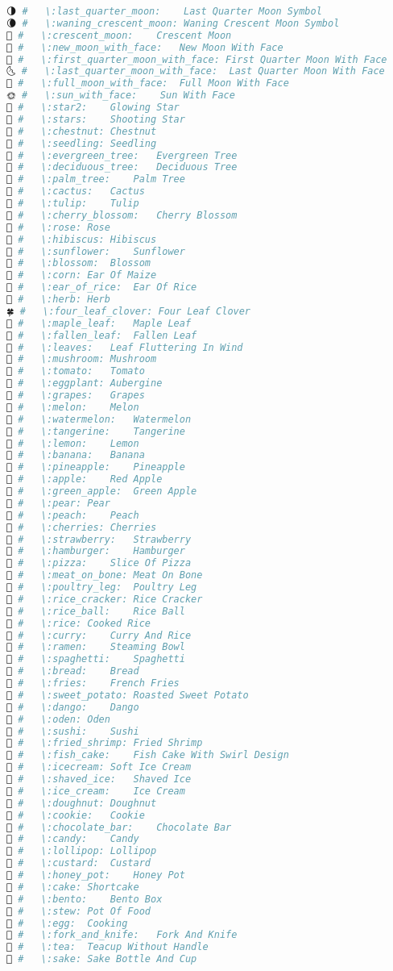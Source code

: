 \begin{lstlisting}[language=Julia, style=julia]
🌗 #   \:last_quarter_moon:    Last Quarter Moon Symbol
🌘 #   \:waning_crescent_moon: Waning Crescent Moon Symbol
🌙 #   \:crescent_moon:    Crescent Moon
🌚 #   \:new_moon_with_face:   New Moon With Face
🌛 #   \:first_quarter_moon_with_face: First Quarter Moon With Face
🌜 #   \:last_quarter_moon_with_face:  Last Quarter Moon With Face
🌝 #   \:full_moon_with_face:  Full Moon With Face
🌞 #   \:sun_with_face:    Sun With Face
🌟 #   \:star2:    Glowing Star
🌠 #   \:stars:    Shooting Star
🌰 #   \:chestnut: Chestnut
🌱 #   \:seedling: Seedling
🌲 #   \:evergreen_tree:   Evergreen Tree
🌳 #   \:deciduous_tree:   Deciduous Tree
🌴 #   \:palm_tree:    Palm Tree
🌵 #   \:cactus:   Cactus
🌷 #   \:tulip:    Tulip
🌸 #   \:cherry_blossom:   Cherry Blossom
🌹 #   \:rose: Rose
🌺 #   \:hibiscus: Hibiscus
🌻 #   \:sunflower:    Sunflower
🌼 #   \:blossom:  Blossom
🌽 #   \:corn: Ear Of Maize
🌾 #   \:ear_of_rice:  Ear Of Rice
🌿 #   \:herb: Herb
🍀 #   \:four_leaf_clover: Four Leaf Clover
🍁 #   \:maple_leaf:   Maple Leaf
🍂 #   \:fallen_leaf:  Fallen Leaf
🍃 #   \:leaves:   Leaf Fluttering In Wind
🍄 #   \:mushroom: Mushroom
🍅 #   \:tomato:   Tomato
🍆 #   \:eggplant: Aubergine
🍇 #   \:grapes:   Grapes
🍈 #   \:melon:    Melon
🍉 #   \:watermelon:   Watermelon
🍊 #   \:tangerine:    Tangerine
🍋 #   \:lemon:    Lemon
🍌 #   \:banana:   Banana
🍍 #   \:pineapple:    Pineapple
🍎 #   \:apple:    Red Apple
🍏 #   \:green_apple:  Green Apple
🍐 #   \:pear: Pear
🍑 #   \:peach:    Peach
🍒 #   \:cherries: Cherries
🍓 #   \:strawberry:   Strawberry
🍔 #   \:hamburger:    Hamburger
🍕 #   \:pizza:    Slice Of Pizza
🍖 #   \:meat_on_bone: Meat On Bone
🍗 #   \:poultry_leg:  Poultry Leg
🍘 #   \:rice_cracker: Rice Cracker
🍙 #   \:rice_ball:    Rice Ball
🍚 #   \:rice: Cooked Rice
🍛 #   \:curry:    Curry And Rice
🍜 #   \:ramen:    Steaming Bowl
🍝 #   \:spaghetti:    Spaghetti
🍞 #   \:bread:    Bread
🍟 #   \:fries:    French Fries
🍠 #   \:sweet_potato: Roasted Sweet Potato
🍡 #   \:dango:    Dango
🍢 #   \:oden: Oden
🍣 #   \:sushi:    Sushi
🍤 #   \:fried_shrimp: Fried Shrimp
🍥 #   \:fish_cake:    Fish Cake With Swirl Design
🍦 #   \:icecream: Soft Ice Cream
🍧 #   \:shaved_ice:   Shaved Ice
🍨 #   \:ice_cream:    Ice Cream
🍩 #   \:doughnut: Doughnut
🍪 #   \:cookie:   Cookie
🍫 #   \:chocolate_bar:    Chocolate Bar
🍬 #   \:candy:    Candy
🍭 #   \:lollipop: Lollipop
🍮 #   \:custard:  Custard
🍯 #   \:honey_pot:    Honey Pot
🍰 #   \:cake: Shortcake
🍱 #   \:bento:    Bento Box
🍲 #   \:stew: Pot Of Food
🍳 #   \:egg:  Cooking
🍴 #   \:fork_and_knife:   Fork And Knife
🍵 #   \:tea:  Teacup Without Handle
🍶 #   \:sake: Sake Bottle And Cup

\end{lstlisting}
